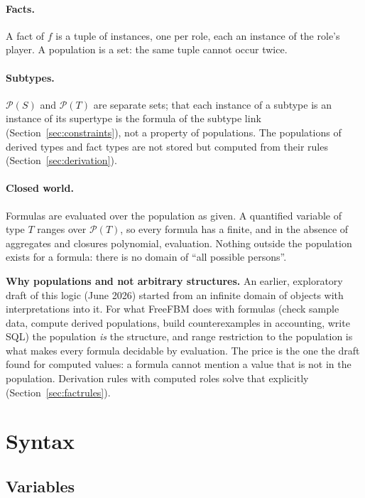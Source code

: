 \documentclass[11pt, a4paper]{article}
\newcommand{\pop}{\mathcal{P}}
\begin{document}
\paragraph{Facts.} A fact of $f$ is a tuple of instances, one per role, each
an instance of the role's player. A population is a set: the same tuple
cannot occur twice.

\paragraph{Subtypes.} $\pop(S)$ and $\pop(T)$ are separate sets; that each
instance of a subtype is an instance of its supertype is the formula of the
subtype link (Section~\ref{sec:constraints}), not a property of populations.
The populations of derived types and fact types are not stored but computed
from their rules (Section~\ref{sec:derivation}).

\paragraph{Closed world.} Formulas are evaluated over the population as
given. A quantified variable of type $T$ ranges over $\pop(T)$, so every
formula has a finite, and in the absence of aggregates and closures
polynomial, evaluation. Nothing outside the population exists for a
formula: there is no domain of ``all possible persons''.

\begin{rationale}
\textbf{Why populations and not arbitrary structures.} An earlier,
exploratory draft of this logic (June 2026) started from an infinite domain of objects with
interpretations into it. For what FreeFBM does with formulas (check sample
data, compute derived populations, build counterexamples in accounting,
write SQL) the population \emph{is} the structure, and range restriction to
the population is what makes every formula decidable by evaluation. The
price is the one the draft found for computed values: a formula cannot
mention a value that is not in the population. Derivation rules with
computed roles solve that explicitly (Section~\ref{sec:factrules}).
\end{rationale}

\section{Syntax}
\label{sec:syntax}

\subsection{Variables}
\end{document}
